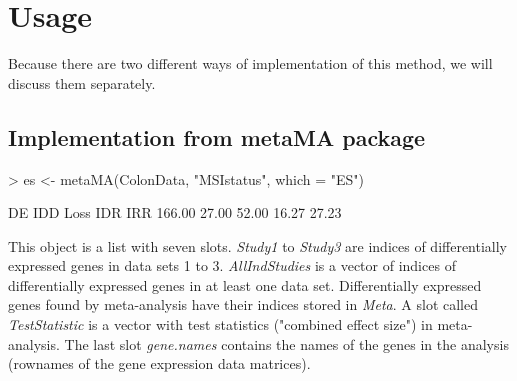 \documentclass[a4paper]{report}
\begin{document}
\section*{Usage}
Because there are two different ways of implementation of this method, we will discuss them separately.
\subsection*{Implementation from metaMA package}
\begin{Schunk}
\begin{Sinput}
> es <- metaMA(ColonData, "MSIstatus", which = "ES")
\end{Sinput}
\begin{Soutput}
    DE    IDD   Loss    IDR    IRR 
166.00  27.00  52.00  16.27  27.23 
\end{Soutput}
\end{Schunk}
This object is a list with seven slots. \emph{Study1} to \emph{Study3} are indices of differentially expressed genes in data sets 1 to 3. \emph{AllIndStudies} is a vector of indices of differentially expressed genes in at least one data set. Differentially expressed genes found by meta-analysis have their indices stored in \emph{Meta}. A slot called \emph{TestStatistic} is a vector with test statistics ("combined effect size") in meta-analysis. The last slot \emph{gene.names} contains the names of the genes in the analysis (rownames of the gene expression data matrices). 
\end{document}
